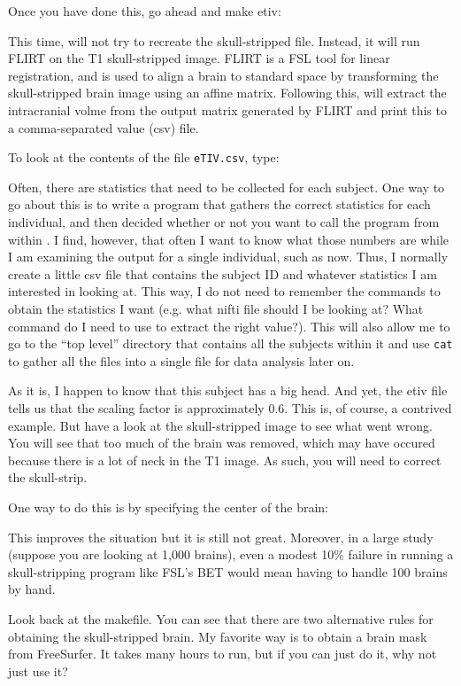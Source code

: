 Once you have done this, go ahead and make etiv:

This time, \maken{} will not try to recreate the skull-stripped file. Instead, it will run FLIRT on the T1 skull-stripped image. FLIRT is a FSL tool for linear registration, and is used to align a brain to standard space by transforming the skull-stripped brain image using an affine matrix. Following this, \maken{} will extract the intracranial volme from the output matrix generated by FLIRT and print this to a comma-separated value (csv) file.

To look at the contents of the file \texttt{eTIV.csv}, type:

Often, there are statistics that need to be collected for each subject. One way to go about this is to write a program that gathers the correct statistics for each individual, and then decided whether or not you want to call the program from within \maken{}. I find, however, that often I want to know what those numbers are while I am examining the output for a single individual, such as now. Thus, I normally create a little csv file that contains the subject ID and whatever statistics I am interested in looking at. This way, I do not need to remember the commands to obtain the statistics I want (e.g. what nifti file should I be looking at? What command do I need to use to extract the right value?). This will also allow me to go to the ``top level'' directory that contains all the subjects within it and use \texttt{cat} to gather all the files into a single file for data analysis later on.

As it is, I happen to know that this subject has a big head. And yet, the etiv file tells us that the scaling factor is approximately 0.6. This is, of course, a contrived example. But have a look at the skull-stripped image to see what went wrong. You will see that too
much of the brain was removed, which may have occured because there is a lot of neck in the T1 image.
As such, you will need to correct the skull-strip.

One way to do this is by specifying the center of the brain:

This improves the situation but it is still not great. Moreover, in a large study (suppose you are looking at 1,000 brains), even a modest 10\% failure in running a skull-stripping program like FSL's BET would mean having to handle 100 brains by hand.  

Look back at the makefile. You can see that there are two alternative rules for
obtaining the skull-stripped brain. My favorite way is to obtain a brain
mask from FreeSurfer. It takes many hours to run, but if you can just do
it, why not just use it? %

